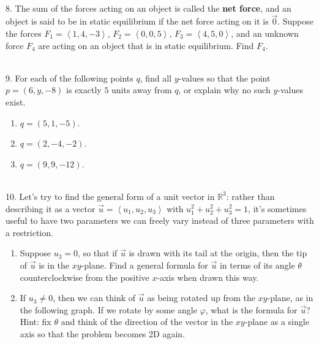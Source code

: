 \documentclass{article}
\begin{document}
~\\

8. The sum of the forces acting on an object is called the \textbf{net force}, and an object is said to be in static equilibrium if the net force acting on it is $\vec{0}$. Suppose the forces $F_1 = \left< 1, 4, -3 \right>$, $F_2 = \left< 0, 0, 5 \right>$, $F_3 = \left< 4, 5, 0 \right>$, and an unknown force $F_4$ are acting on an object that is in static equilibrium. Find $F_4$.

~\\

9. For each of the following points $q$, find all $y$-values so that the point $p = (6, y, -8)$ is exactly $5$ units away from $q$, or explain why no such $y$-values exist.

\begin{enumerate}

	\item $q = (5, 1, -5)$.

	\item $q = (2, -4, -2)$.

	\item $q = (9, 9, -12)$.

\end{enumerate}

~\\

10. Let's try to find the general form of a unit vector in $\mathbb{R}^3$: rather than describing it as a vector $\vec{u} = \left< u_1, u_2, u_3 \right>$ with $u_1^2 + u_2^2 + u_3^2 = 1$, it's sometimes useful to have two parameters we can freely vary instead of three parameters with a restriction.

\begin{enumerate}

	\item Suppose $u_3 = 0$, so that if $\vec{u}$ is drawn with its tail at the origin, then the tip of $\vec{u}$ is in the $xy$-plane. Find a general formula for $\vec{u}$ in terms of its angle $\theta$ counterclockwise from the positive $x$-axis when drawn this way.

	\item If $u_3 \neq 0$, then we can think of $\vec{u}$ as being rotated up from the $xy$-plane, as in the following graph. If we rotate by some angle $\varphi$, what is the formula for $\vec{u}$? Hint: fix $\theta$ and think of the direction of the vector in the $xy$-plane as a single axis so that the problem becomes 2D again.

\end{enumerate}
\end{document}
